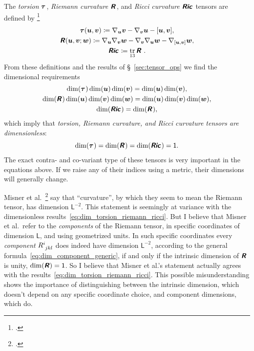 \documentclass[a4paper,12pt,onecolumn,oneside,article,british]{memoir}
\makeatletter
\newcommand*{\mathte}[1]{\textbf{\textit{\textsf{#1}}}}
\newcommand*{\citep}{\footcites}
\DeclareMathOperator{\tr}{tr}%
\newcommand*{\defd}{\coloneqq}
\DeclarePairedDelimiter\clcl{[}{]}
\newcommand*{\sect}{\S}%
\newcommand*{\etal}{{et al.}}
\newcommand*{\q}{}%
\DeclareRobustCommand*{\q}{%
  \mathbin{\mathpalette\bigcdot@{}}%
}
\newcommand*{\bigcdot@scalefactor}{0.7}
\newcommand*{\bigcdot@widthfactor}{1.5}
\newcommand*{\bigcdot@}[2]{%
  \sbox0{$#1\vcenter{}$}%
  \sbox2{$#1\cdot\m@th$}%
  \hbox to \bigcdot@widthfactor\wd2{%
    \hfil
    \raise\ht0\hbox{%
      \scalebox{\bigcdot@scalefactor}{%
        \lower\ht0\hbox{$#1\bullet\m@th$}%
      }%
    }%
    \hfil
  }%
}
\newcommand*{\Un}{\textsf{1}}
\newcommand*{\Le}{\textsf{L}}
\newcommand*{\yR}{\mathte{R}}
\newcommand*{\yRi}{\mathte{Ric}}
\newcommand*{\yTo}{\bm{\tau}}
\newcommand*{\yv}{\bm{v}}
\newcommand*{\yu}{\bm{u}}
\newcommand*{\yw}{\bm{w}}
\renewcommand*{\i}{\indices}
\newcommand*{\nab}{\nabla}
\makeatother
\begin{document}
The \emph{torsion} $\yTo\i{^{\q}_{\q\q}}$, \emph{Riemann
  curvature} $\yR\i{^{\q}_{\q\q\q}}$, and \emph{Ricci
  curvature} $\yRi\i{_{\q\q}}$ tensors are defined by
\citep[\sect~V.B.1]{choquetbruhatetal1977_r1996}
\begin{gather}
  \label{eq:torsion_eq}
\yTo(\yu,\yv) \defd \nab_{\yu}\yv - \nab_{\yv}\yu - \clcl{\yu,\yv},
\\
\yR(\yu,\yv;\yw) \defd
\nab_{\yu}\nab_{\yv}\yw - \nab_{\yv}\nab_{\yu}\yw
- \nab_{\clcl{\yu,\yv}}\yw,
  \label{eq:riemann_eq}  
\\
\yRi\i{_{\q\q}} \defd \tr_{13} \yR\i{^{\q}_{\q\q\q}} \;.
  \label{eq:ricci_eq}  
\end{gather}
From these definitions and the results of \sect~\ref{sec:tensor_ops} we
find the dimensional requirements
\begin{gather}
  \label{eq:torsion_eq_dim}
\dim(\yTo\i{^{\q}_{\q\q}})\dim(\yu)\dim(\yv) = \dim(\yu) \dim(\yv),
\\
\dim(\yR\i{^{\q}_{\q\q\q}})\dim(\yu)\dim(\yv)\dim(\yw) =
\dim(\yu)\dim(\yv)\dim(\yw),
\label{eq:riemann_eq_dim}
\\
\dim(\yRi\i{_{\q\q}}) = \dim(\yR\i{^{\q}_{\q\q\q}}),
  \label{eq:ricci_eq_dim}  
\end{gather}
which imply that \emph{torsion, Riemann curvature, and Ricci curvature
  tensors are dimensionless}:
\begin{equation}
  \label{eq:dim_torsion_riemann_ricci}
  \dim(\yTo\i{^{\q}_{\q\q}}) =
   \dim(\yR\i{^{\q}_{\q\q\q}}) =
   \dim(\yRi\i{_{\q\q}}) =\Un.
\end{equation}
The exact contra- and co-variant type of these tensors is very important in
the equations above. If we raise any of their indices using a metric, their
dimensions will generally change.

Misner \etal\ \citep[p.~35%
]{misneretal1970_r1973} say that \enquote{curvature}, by which they seem to
mean the Riemann tensor, has dimension $\Le^{-2}$. This statement is
seemingly at variance with the dimensionless
results~\eqref{eq:dim_torsion_riemann_ricci}. But I believe that Misner
\etal\ refer to the \emph{components} of the Riemann tensor, in specific
coordinates of dimension $\Le$, and using geometrized units. In such
specific coordinates every \emph{component} $R\i{^{i}_{jkl}}$ does indeed
have dimension $\Le^{-2}$, according to the general
formula~\eqref{eq:dim_component_generic}, if and only if the intrinsic
dimension of $\yR$ is unity, $\dim(\yR)=\Un$. So I believe that Misner
\etal's statement actually agrees with the
results~\eqref{eq:dim_torsion_riemann_ricci}. This possible
misunderstanding shows the importance of distinguishing between the
intrinsic dimension, which doesn't depend on any specific coordinate
choice, and component dimensions, which do.
\end{document}
